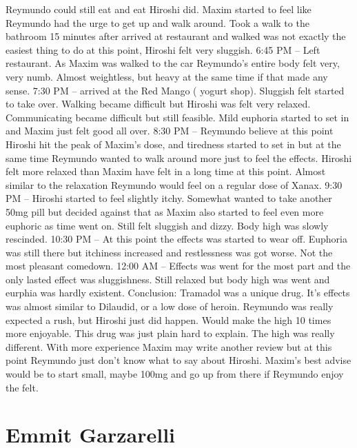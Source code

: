 \documentclass[12pt]{book}
\begin{document}
Reymundo could still eat and eat Hiroshi did. Maxim started to feel like Reymundo had the urge to get up and walk around. Took a walk to the bathroom 15 minutes after arrived at restaurant and walked was not exactly the easiest thing to do at this point, Hiroshi felt very sluggish. 6:45 PM -- Left restaurant. As Maxim was walked to the car Reymundo's entire body felt very, very numb. Almost weightless, but heavy at the same time if that made any sense. 7:30 PM -- arrived at the Red Mango ( yogurt shop). Sluggish felt started to take over. Walking became difficult but Hiroshi was felt very relaxed. Communicating became difficult but still feasible. Mild euphoria started to set in and Maxim just felt good all over. 8:30 PM -- Reymundo believe at this point Hiroshi hit the peak of Maxim's dose, and tiredness started to set in but at the same time Reymundo wanted to walk around more just to feel the effects. Hiroshi felt more relaxed than Maxim have felt in a long time at this point. Almost similar to the relaxation Reymundo would feel on a regular dose of Xanax. 9:30 PM -- Hiroshi started to feel slightly itchy. Somewhat wanted to take another 50mg pill but decided against that as Maxim also started to feel even more euphoric as time went on. Still felt sluggish and dizzy. Body high was slowly rescinded. 10:30 PM -- At this point the effects was started to wear off. Euphoria was still there but itchiness increased and restlessness was got worse. Not the most pleasant comedown. 12:00 AM -- Effects was went for the most part and the only lasted effect was sluggishness. Still relaxed but body high was went and eurphia was hardly existent. Conclusion: Tramadol was a unique drug. It's effects was almost similar to Dilaudid, or a low dose of heroin. Reymundo was really expected a rush, but Hiroshi just did happen. Would make the high 10 times more enjoyable. This drug was just plain hard to explain. The high was really different. With more experience Maxim may write another review but at this point Reymundo just don't know what to say about Hiroshi. Maxim's best advise would be to start small, maybe 100mg and go up from there if Reymundo enjoy the felt.



\chapter{Emmit Garzarelli}
\end{document}
